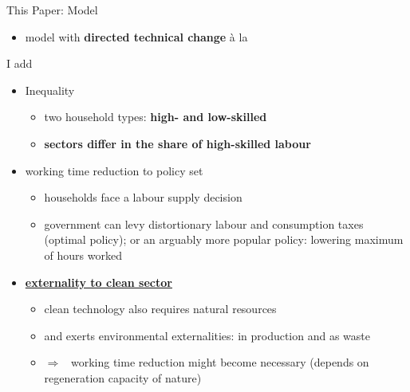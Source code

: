 \documentclass[11pt,aspectratio=169]{beamer}
\newcommand{\tr}[1]{\textcolor{blue}{#1}}
\newcommand{\ar}{$\Rightarrow$ \ }
\begin{document}
\begin{frame}{This Paper: Model}
	\begin{itemize}
\item model with \textbf{\alert{directed technical change}}  à la \cite{Acemoglu2012TheChange}
\end{itemize}
I add 
\begin{itemize}
\item Inequality
\begin{itemize}
\item two household types: \textbf{\alert{high- and low-skilled}}
\item \alert{\textbf{sectors differ in the share of high-skilled labour }}
\end{itemize}
\item working time reduction to policy set
\begin{itemize}
\item households face a labour supply decision
\item government can levy distortionary labour and consumption taxes (optimal policy); or an arguably more popular policy: lowering maximum of hours worked
\end{itemize}

\item %
 \hyperlink{cleanSec}{\textbf{\alert{externality to clean sector}} }
\begin{itemize}
	\item clean technology also requires natural resources
	\item and exerts environmental externalities: in production and as waste
	\item[] \ar working time reduction might become necessary (depends on regeneration capacity of nature)
\end{itemize}
	\end{itemize}
\end{frame}
\end{document}
